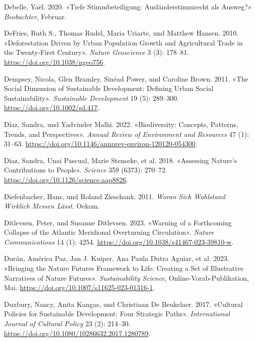 \documentclass[
  nswissgerman,
  a4paper,
  DIV=11,
  numbers=noendperiod,
  oneside,
  openany]{scrreprt}
\newlength{\cslhangindent}
\newenvironment{CSLReferences}[2] %
 {\begin{list}{}{%
  \setlength{\itemindent}{0pt}
  \setlength{\leftmargin}{0pt}
  \setlength{\parsep}{0pt}
  \ifodd #1
   \setlength{\leftmargin}{\cslhangindent}
   \setlength{\itemindent}{-1\cslhangindent}
  \fi
  \setlength{\itemsep}{#2\baselineskip}}}
 {\end{list}}
\begin{document}
\begin{CSLReferences}{1}{1}
Debelle, Yaël. 2020. {«{Tiefe Stimmbeteiligung: Ausl{ä}nderstimmrecht
als Ausweg?}»} \emph{Beobachter}, Februar.

DeFries, Ruth S., Thomas Rudel, Maria Uriarte, und Matthew Hansen. 2010.
{«Deforestation Driven by Urban Population Growth and Agricultural Trade
in the Twenty-First Century»}. \emph{Nature Geoscience} 3 (3): 178--81.
\url{https://doi.org/10.1038/ngeo756}.

Dempsey, Nicola, Glen Bramley, Sinéad Power, und Caroline Brown. 2011.
{«The Social Dimension of Sustainable Development: {Defining} Urban
Social Sustainability»}. \emph{Sustainable Development} 19 (5):
289--300. \url{https://doi.org/10.1002/sd.417}.

Díaz, Sandra, und Yadvinder Malhi. 2022. {«Biodiversity: {Concepts},
{Patterns}, {Trends}, and {Perspectives}»}. \emph{Annual Review of
Environment and Resources} 47 (1): 31--63.
\url{https://doi.org/10.1146/annurev-environ-120120-054300}.

{Díaz, Sandra, Unai Pascual, Marie Stenseke, et al.} 2018. {«Assessing
Nature's Contributions to People»}. \emph{Science} 359 (6373): 270--72.
\url{https://doi.org/10.1126/science.aap8826}.

Diefenbacher, Hans, und Roland Zieschank. 2011. \emph{Woran Sich
{Wohlstand} Wirklich Messen Lässt}. Oekom.

Ditlevsen, Peter, und Susanne Ditlevsen. 2023. {«Warning of a
Forthcoming Collapse of the {Atlantic} Meridional Overturning
Circulation»}. \emph{Nature Communications} 14 (1): 4254.
\url{https://doi.org/10.1038/s41467-023-39810-w}.

Durán, América Paz, Jan J. Kuiper, Ana Paula Dutra Aguiar, et al. 2023.
{«Bringing the {Nature Futures Framework} to Life: Creating a Set of
Illustrative Narratives of Nature Futures»}. \emph{Sustainability
Science}, Online-Vorab-Publikation, Mai.
\url{https://doi.org/10.1007/s11625-023-01316-1}.

Duxbury, Nancy, Anita Kangas, und Christiaan De Beukelaer. 2017.
{«Cultural Policies for Sustainable Development: Four Strategic Paths»}.
\emph{International Journal of Cultural Policy} 23 (2): 214--30.
\url{https://doi.org/10.1080/10286632.2017.1280789}.


\end{CSLReferences}
\end{document}
